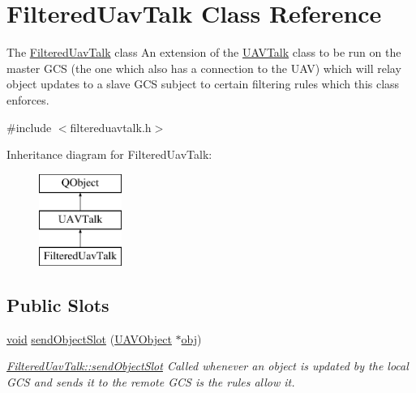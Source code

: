 \hypertarget{class_filtered_uav_talk}{\section{Filtered\-Uav\-Talk Class Reference}
\label{class_filtered_uav_talk}
}


The \hyperlink{class_filtered_uav_talk}{Filtered\-Uav\-Talk} class An extension of the \hyperlink{class_u_a_v_talk}{U\-A\-V\-Talk} class to be run on the master G\-C\-S (the one which also has a connection to the U\-A\-V) which will relay object updates to a slave G\-C\-S subject to certain filtering rules which this class enforces.  




{\ttfamily \#include $<$filtereduavtalk.\-h$>$}

Inheritance diagram for Filtered\-Uav\-Talk\-:\begin{figure}[H]
\begin{center}
\leavevmode
\includegraphics[height=3.000000cm]{class_filtered_uav_talk}
\end{center}
\end{figure}
\subsection*{Public Slots}
\begin{DoxyCompactItemize}
\item 
\hyperlink{group___u_a_v_objects_plugin_ga444cf2ff3f0ecbe028adce838d373f5c}{void} \hyperlink{group___u_a_v_talk_ga41ca9188bbbc0be7e458f94ef49117df}{send\-Object\-Slot} (\hyperlink{class_u_a_v_object}{U\-A\-V\-Object} $\ast$\hyperlink{glext_8h_a0c0d4701a6c89f4f7f0640715d27ab26}{obj})
\begin{DoxyCompactList}\small\item\em \hyperlink{group___u_a_v_talk_ga41ca9188bbbc0be7e458f94ef49117df}{Filtered\-Uav\-Talk\-::send\-Object\-Slot} Called whenever an object is updated by the local G\-C\-S and sends it to the remote G\-C\-S is the rules allow it. \end{DoxyCompactList}\end{DoxyCompactItemize}
